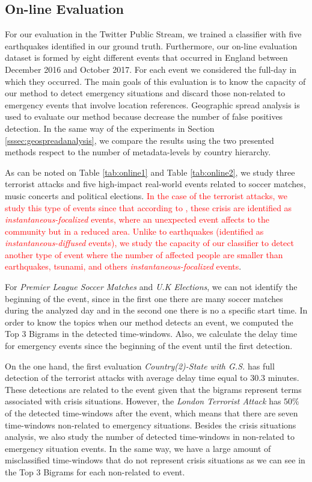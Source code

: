 \documentclass[sigconf]{acmart}
\begin{document}
\subsection{On-line Evaluation}
For our evaluation in the Twitter Public Stream, we trained a classifier with five earthquakes identified in our ground truth. Furthermore, our on-line evaluation dataset is formed by eight different events that occurred in England between December 2016 and October 2017. For each event we considered the full-day in which they occurred. The main goals of this evaluation is to know the capacity of our method to detect emergency situations and discard those non-related to emergency events that involve location references. Geographic spread analysis is used to evaluate our method because decrease the number of false positives detection. In the same way of the experiments in Section \ref{sssec:geospreadanalysis}, we compare the results using the two presented methods respect to the number of metadata-levels by country hierarchy.

As can be noted on Table \ref{tab:online1} and Table \ref{tab:online2}, we study three terrorist attacks and five high-impact real-world events related to soccer matches, music concerts and political elections. \textcolor{red}{In the case of the terrorist attacks, we study this type of events since that according to \citeauthor{carr1932disaster} \cite{carr1932disaster}, these crisis are identified as \textit{instantaneous-focalized} events, where an unexpected event affects to the community but in a reduced area. Unlike to earthquakes (identified as \textit{instantaneous-diffused} events), we study the capacity of our classifier to detect another type of event where the number of affected people are smaller than earthquakes, tsunami, and others \textit{instantaneous-focalized} events}.

For \textit{Premier League Soccer Matches} and \textit{U.K Elections}, we can not identify the beginning of the event, since in the first one there are many soccer matches during the analyzed day and in the second one there is no a specific start time. In order to know the topics when our method detects an event, we computed the Top 3 Bigrams in the detected time-windows. Also, we calculate the delay time for emergency events since the beginning of the event until the first detection.

On the one hand, the first evaluation \textit{Country(2)-State with G.S.} has full detection of the terrorist attacks with average delay time equal to $30.3$ minutes. These detections are related to the event given that the bigrams represent terms associated with crisis situations. However, the \textit{London Terrorist Attack} has $50\%$ of the detected time-windows after the event, which means that there are seven time-windows non-related to emergency situations. Besides the crisis situations analysis, we also study the number of detected time-windows in non-related to emergency situation events. In the same way, we have a large amount of misclassified time-windows that do not represent crisis situations as we can see in the Top 3 Bigrams for each non-related to event.
\end{document}
